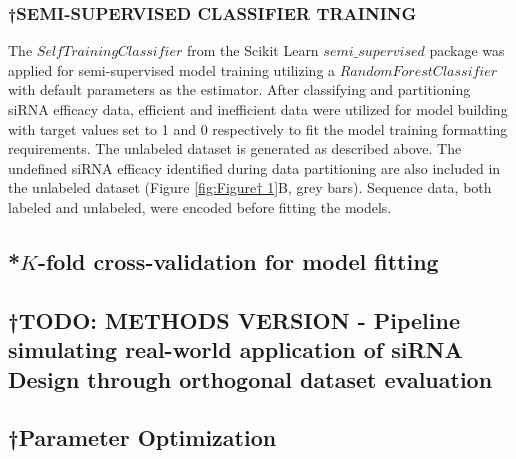 \documentclass{report}
\begin{document}
\subsubsection{†SEMI-SUPERVISED CLASSIFIER TRAINING}
The $SelfTrainingClassifier$ from the Scikit Learn $semi\_supervised$ package was applied for semi-supervised model training \cite{pedregosa_scikit-learn_2011} utilizing a $RandomForestClassifier$ with default parameters as the estimator. After classifying and partitioning siRNA efficacy data, efficient and inefficient data were utilized for model building with target values set to 1 and 0 respectively to fit the model training formatting requirements. The unlabeled dataset is generated as described above. The undefined siRNA efficacy identified during data partitioning are also included in the unlabeled dataset (Figure \ref{fig:Figure† 1}B, grey bars). Sequence data, both labeled and unlabeled, were encoded before fitting the models.



\subsection{*$K$-fold cross-validation for model fitting}


\subsection{†TODO: METHODS VERSION - Pipeline simulating real-world application of siRNA Design through orthogonal dataset evaluation}



\subsection{†Parameter Optimization}\label{met:parameter optimization}
\end{document}
